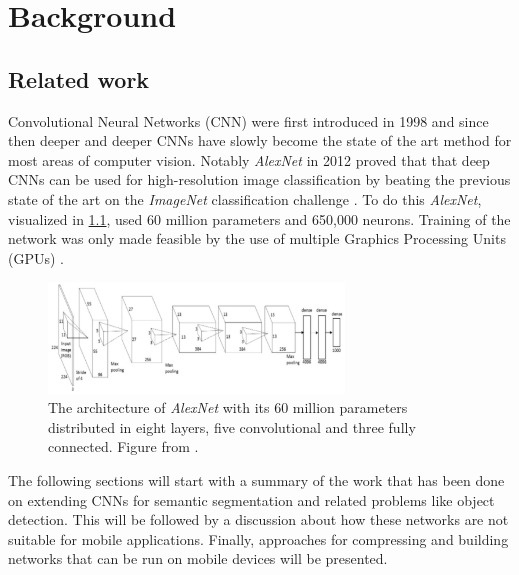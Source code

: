 \documentclass{kththesis}
\newcommand{\bibentry}[1]{\parencite{#1}}
\begin{document}
\chapter{Background}
\section{Related work}
Convolutional Neural Networks (CNN) were first introduced in 1998
\bibentry{lecun1998gradient} and since then deeper and deeper CNNs have slowly
become the state of the art method for most areas of computer vision. Notably
\emph{AlexNet} \bibentry{krizhevsky2012imagenet} in 2012 proved that that deep
CNNs can be used for high-resolution image classification by beating the
previous state of the art \bibentry{sanchez2011high} on the \emph{ImageNet}
classification challenge \bibentry{deng2009imagenet}. To do this \emph{AlexNet},
visualized in \cref{fig:AlexNet}, 
used 60 million parameters and 650,000 neurons. Training of the network was
only made feasible by the use of multiple Graphics Processing Units (GPUs)
\bibentry{krizhevsky2012imagenet}.

\begin{figure}[h]
  \centering
  \includegraphics[width=0.7\textwidth]{AlexNet}
  \caption{The architecture of \textit{AlexNet} with its 60 million parameters
    distributed
    in eight layers, five convolutional and three fully connected. Figure from \textcite{krizhevsky2012imagenet}.}
  \label{fig:AlexNet}
  \end{figure}

The following sections will start with a summary of the work that has been done
on extending CNNs for semantic segmentation and related problems like
object detection. This will be followed by a discussion about how these networks
are not suitable for mobile applications. Finally, approaches for compressing
and building networks that can be run on mobile devices will be presented.
\end{document}
